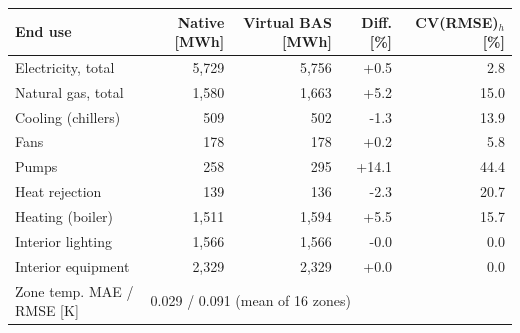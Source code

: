 \begin{tabular}{lrrrr}
\toprule
End use & Native [MWh] & Virtual BAS [MWh] & Diff. [\%] & CV(RMSE)$_h$ [\%] \\
\midrule
Electricity, total & 5,729 & 5,756 & +0.5 & 2.8 \\
Natural gas, total & 1,580 & 1,663 & +5.2 & 15.0 \\
Cooling (chillers) & 509 & 502 & -1.3 & 13.9 \\
Fans & 178 & 178 & +0.2 & 5.8 \\
Pumps & 258 & 295 & +14.1 & 44.4 \\
Heat rejection & 139 & 136 & -2.3 & 20.7 \\
Heating (boiler) & 1,511 & 1,594 & +5.5 & 15.7 \\
Interior lighting & 1,566 & 1,566 & -0.0 & 0.0 \\
Interior equipment & 2,329 & 2,329 & +0.0 & 0.0 \\
\midrule
Zone temp. MAE / RMSE [K] & \multicolumn{4}{l}{0.029 / 0.091 (mean of 16 zones)} \\
\bottomrule
\end{tabular}